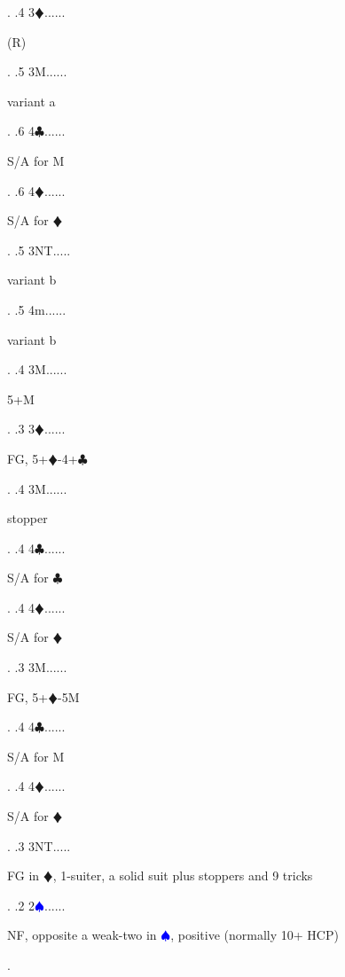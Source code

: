 \documentclass[a4paper]{article}
\newcommand{\BC}{\textcolor{OliveGreen}{$\clubsuit$}}
\newcommand{\BD}{\textcolor{RedOrange}{$\vardiamondsuit$}}
\newcommand{\BS}{\textcolor{Blue}{$\spadesuit${}}}
\begin{document}
{\begin{minipage}[t]{0.8\textwidth}
\end{minipage}. 
 .4 3\BD......\begin{minipage}[t]{0.8\textwidth}
(R)
\end{minipage}. 
 .5 3M......\begin{minipage}[t]{0.8\textwidth}
variant a
\end{minipage}. 
 .6 4\BC......\begin{minipage}[t]{0.8\textwidth}
S/A for M
\end{minipage}. 
 .6 4\BD......\begin{minipage}[t]{0.8\textwidth}
S/A for \BD 
\end{minipage}. 
 .5 3NT.....\begin{minipage}[t]{0.8\textwidth}
variant b
\end{minipage}. 
 .5 4m......\begin{minipage}[t]{0.8\textwidth}
variant b
\end{minipage}. 
 .4 3M......\begin{minipage}[t]{0.8\textwidth}
5+M
\end{minipage}. 
 .3 3\BD......\begin{minipage}[t]{0.8\textwidth}
FG, 5+\BD -4+\BC 
\end{minipage}. 
 .4 3M......\begin{minipage}[t]{0.8\textwidth}
stopper
\end{minipage}. 
 .4 4\BC......\begin{minipage}[t]{0.8\textwidth}
S/A for \BC 
\end{minipage}. 
 .4 4\BD......\begin{minipage}[t]{0.8\textwidth}
S/A for \BD 
\end{minipage}. 
 .3 3M......\begin{minipage}[t]{0.8\textwidth}
FG, 5+\BD -5M
\end{minipage}. 
 .4 4\BC......\begin{minipage}[t]{0.8\textwidth}
S/A for M
\end{minipage}. 
 .4 4\BD......\begin{minipage}[t]{0.8\textwidth}
S/A for \BD 
\end{minipage}. 
 .3 3NT.....\begin{minipage}[t]{0.8\textwidth}
FG in \BD , 1-suiter, a solid suit plus stoppers and 9 tricks
\end{minipage}. 
 .2 2\BS......\begin{minipage}[t]{0.8\textwidth}
NF, opposite a weak-two in \BS , positive (normally 10+ HCP)
\end{minipage}. 
}
\end{document}
